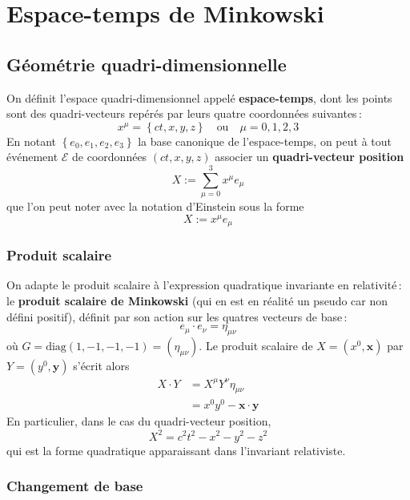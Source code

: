 \section{Espace-temps de Minkowski}

    \subsection{Géométrie quadri-dimensionnelle}

    On définit l’espace quadri-dimensionnel appelé \textbf{espace-temps}, dont les points sont des quadri-vecteurs repérés par leurs quatre coordonnées suivantes : 
    \[ x^{\mu} = \left\{ct, x, y, z\right\} \quad \text{ou} \quad \mu = 0,1,2,3 \]
    En notant $\left\{e_0, e_1, e_2, e_3\right\}$ la base canonique de l’espace-temps, on peut à tout événement $\mathcal{E}$ de coordonnées $(ct, x, y, z)$ associer un \textbf{quadri-vecteur position} 
    \[ X := \sum_{\mu = 0}^3 x^{\mu} e_{\mu} \]
    que l’on peut noter avec la notation d’Einstein sous la forme 
    \[ X := x^{\mu} e_{\mu} \]   


        \subsubsection{Produit scalaire}

        On adapte le produit scalaire à l’expression quadratique invariante en relativité : le \textbf{produit scalaire de Minkowski} (qui en est en réalité un pseudo car non défini positif), définit par son action sur les quatres vecteurs de base :
        \[ e_{\mu} \cdot e_{\nu} =  \eta_{\mu\nu} \]   
        où $G = \text{diag}(1, -1, -1, -1) = (\eta_{\mu\nu})$. Le produit scalaire de $X = (x^0, \mathbf{x})$ par $Y = (y^0, \mathbf{y})$ s’écrit alors 
        \begin{align*}
            X \cdot Y 
            &= X^{\mu} Y^{\nu} \eta_{\mu\nu} \\
            &= x^0 y^0 - \mathbf{x} \cdot \mathbf{y}
        \end{align*}
        En particulier, dans le cas du quadri-vecteur position, 
        \[ X^2 = c^2 t^2 - x^2 -y^2 - z^2 \]   
        qui est la forme quadratique apparaissant dans l’invariant relativiste.

        \subsubsection{Changement de base}

